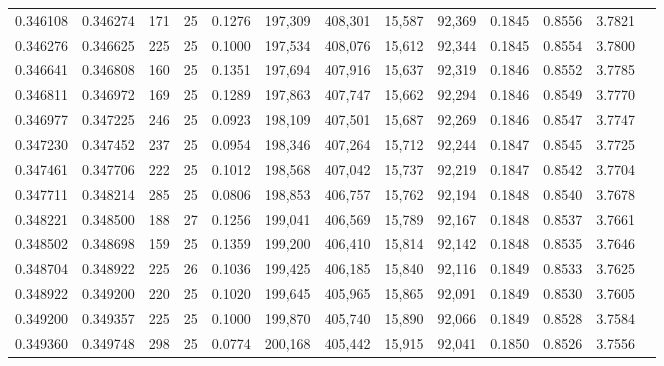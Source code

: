 \begin{tabular}{rrrrrrrrrrrrr}
0.346108 & 0.346274 &   171 &  25 &                                     0.1276 & 197,309 & 408,301 &  15,587 &  92,369 & 0.1845 & 0.8556 & 3.7821 \\
0.346276 & 0.346625 &   225 &  25 &                                     0.1000 & 197,534 & 408,076 &  15,612 &  92,344 & 0.1845 & 0.8554 & 3.7800 \\
0.346641 & 0.346808 &   160 &  25 &                                     0.1351 & 197,694 & 407,916 &  15,637 &  92,319 & 0.1846 & 0.8552 & 3.7785 \\
0.346811 & 0.346972 &   169 &  25 &                                     0.1289 & 197,863 & 407,747 &  15,662 &  92,294 & 0.1846 & 0.8549 & 3.7770 \\
0.346977 & 0.347225 &   246 &  25 &                                     0.0923 & 198,109 & 407,501 &  15,687 &  92,269 & 0.1846 & 0.8547 & 3.7747 \\
0.347230 & 0.347452 &   237 &  25 &                                     0.0954 & 198,346 & 407,264 &  15,712 &  92,244 & 0.1847 & 0.8545 & 3.7725 \\
0.347461 & 0.347706 &   222 &  25 &                                     0.1012 & 198,568 & 407,042 &  15,737 &  92,219 & 0.1847 & 0.8542 & 3.7704 \\
0.347711 & 0.348214 &   285 &  25 &                                     0.0806 & 198,853 & 406,757 &  15,762 &  92,194 & 0.1848 & 0.8540 & 3.7678 \\
0.348221 & 0.348500 &   188 &  27 &                                     0.1256 & 199,041 & 406,569 &  15,789 &  92,167 & 0.1848 & 0.8537 & 3.7661 \\
0.348502 & 0.348698 &   159 &  25 &                                     0.1359 & 199,200 & 406,410 &  15,814 &  92,142 & 0.1848 & 0.8535 & 3.7646 \\
0.348704 & 0.348922 &   225 &  26 &                                     0.1036 & 199,425 & 406,185 &  15,840 &  92,116 & 0.1849 & 0.8533 & 3.7625 \\
0.348922 & 0.349200 &   220 &  25 &                                     0.1020 & 199,645 & 405,965 &  15,865 &  92,091 & 0.1849 & 0.8530 & 3.7605 \\
0.349200 & 0.349357 &   225 &  25 &                                     0.1000 & 199,870 & 405,740 &  15,890 &  92,066 & 0.1849 & 0.8528 & 3.7584 \\
0.349360 & 0.349748 &   298 &  25 &                                     0.0774 & 200,168 & 405,442 &  15,915 &  92,041 & 0.1850 & 0.8526 & 3.7556 \\

\end{tabular}
